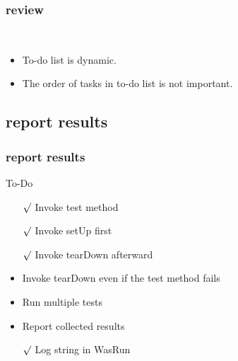 \documentclass[lualatex]{beamer}
\begin{document}
\begin{frame}
  \frametitle{review}

  \begin{block}{~}
    \begin{itemize}
    \item 
      To-do list is dynamic.
    \item 
      The order of tasks in to-do list is not important.
    \end{itemize}
  \end{block}
\end{frame}

\subsection{report results}

\begin{frame}
  \frametitle{report results}

  \begin{block}{To-Do}
    \begin{itemize}
    \item[$\surd$] Invoke test method
    \item[$\surd$] Invoke setUp first 
    \item[$\surd$] Invoke tearDown afterward 
    \item Invoke tearDown even if the test method fails 
    \item Run multiple tests 
    \item Report collected results 
    \item[$\surd$] Log string in WasRun 
    \end{itemize}
  \end{block}
\end{frame}
\end{document}
